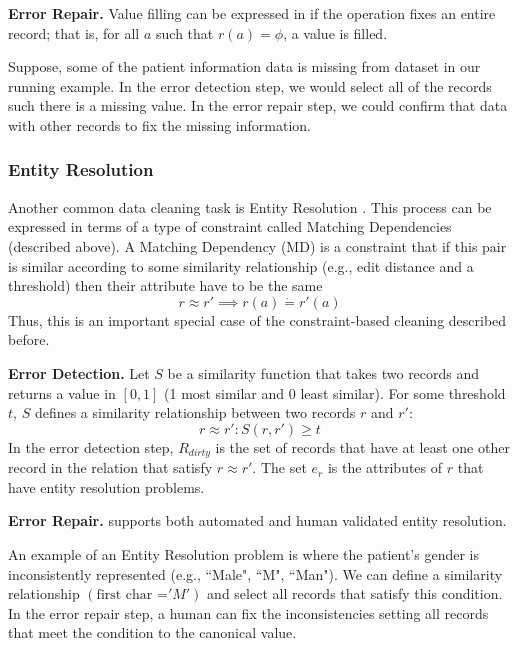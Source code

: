 \vspace{0.5em}

\noindent\textbf{Error Repair. } Value filling can be expressed in \sys if the operation fixes an entire record; that is, for all $a$ such that $r(a) = \phi$, a value is filled.

\begin{example}
Suppose, some of the patient information data is missing from dataset in our running example.
In the error detection step, we would select all of the records such there is a missing value.
In the error repair step, we could confirm that data with other records to fix the missing information.
\end{example}

\subsubsection{Entity Resolution}
Another common data cleaning task is Entity Resolution \cite{gokhale2014corleone, DBLP:journals/pvldb/KopckeTR10}.
This process can be expressed in terms of a type of constraint called Matching Dependencies (described above).
A Matching Dependency (MD) is a constraint that if this pair is similar according to some similarity relationship (e.g., edit distance and a threshold) then their attribute have to be the same
\[ r \approx r' \implies r(a) \dot{=} r'(a) \]
Thus, this is an important special case of the constraint-based cleaning described before.

\vspace{0.5em}

\noindent\textbf{Error Detection. } Let $S$ be a similarity function that takes two records and returns a value in $[0,1]$ (1 most similar and 0 least similar). For some threshold $t$, $S$ defines a similarity relationship between two records $r$ and $r'$:
\[
r \approx r' : S(r,r') \ge t
\] 
In the error detection step, $R_{dirty}$ is the set of records that have at least one other record in the relation that satisfy $r \approx r'$.
The set $e_r$ is the attributes of $r$ that have entity resolution problems.

\vspace{0.5em}

\noindent\textbf{Error Repair. } \sys supports both automated and human validated entity resolution.

\begin{example}
An example of an Entity Resolution problem is where the patient's gender is inconsistently represented (e.g., ``Male", ``M", ``Man"). 
We can define a similarity relationship $(\text{first char =} 'M')$ and select all records that satisfy this condition.
In the error repair step, a human can fix the inconsistencies setting all records that meet the condition to the canonical value.
\end{example}

